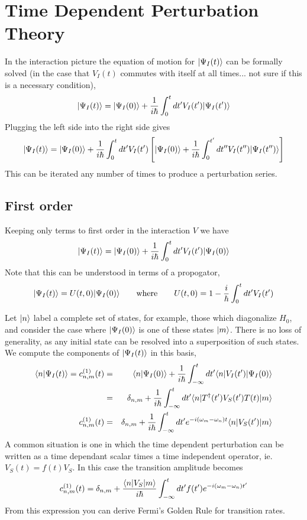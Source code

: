 \section{Time Dependent Perturbation Theory}

In the interaction picture the equation of motion for $| \Psi_{I}(t) \rangle$ can be formally solved (in the case that $V_I(t)$ commutes with itself at all times... not sure if this is a necessary condition), \begin{equation}
| \Psi_{I}(t) \rangle = | \Psi_{I}(0) \rangle+\frac{1}{i \hbar}\int_{0}^{t}dt'V_{I}(t')| \Psi_{I}(t') \rangle \end{equation}
Plugging the left side into the right side gives \begin{equation}
| \Psi_{I}(t) \rangle=| \Psi_{I}(0) \rangle+\frac{1}{i \hbar}\int_{0}^{t}dt'V_{I}(t')\left[| \Psi_{I}(0) \rangle+\frac{1}{i \hbar}\int_{0}^{t'}dt''V_{I}(t'')| \Psi_I(t'') \rangle\right]\end{equation}
This can be iterated any number of times to produce a perturbation series.

\subsection{First order}
Keeping only terms to first order in the interaction $V$ we have \begin{equation}
| \Psi_{I}(t) \rangle=| \Psi_{I}(0) \rangle+\frac{1}{i \hbar}\int_{0}^{t}dt'V_{I}(t')| \Psi_{I}(0) \rangle\end{equation}
Note that this can be understood in terms of a propogator, \begin{equation}
| \Psi_{I}(t) \rangle=U(t,0)| \Psi_{I}(0) \rangle\qquad\textrm{where}\qquad U(t,0)=1-\frac{i}{\hbar}\int_{0}^{t}dt'V_{I}(t')\end{equation}

Let $| n \rangle$ label a complete set of states, for example, those which diagonalize $H_0$, and consider the case where $| \Psi_I(0) \rangle$ is one of these states $| m \rangle$. There is no loss of generality, as any initial state can be resolved into a superposition of such states. We compute the components of $| \Psi_I(t) \rangle$ in this basis,
\begin{eqnarray}
\langle n|\Psi_I(t)\rangle = c^{(1)}_{n,m}(t) &=& \langle n|\Psi_I(0)\rangle + \frac{1}{i\hbar}\int_{-\infty}^t dt' \langle n |V_I(t')| \Psi_I(0) \rangle \\
&=& \delta_{n,m} + \frac{1}{i \hbar}\int_{-\infty}^t dt' \langle n |T^{\dagger}(t')V_S(t')T(t)| m \rangle \\
c^{(1)}_{n,m}(t) &=& \delta_{n,m} + \frac{1}{i \hbar}\int_{-\infty}^t dt' e^{-i (\omega_m-\omega_n) t} \langle n |V_S(t')| m \rangle
\end{eqnarray}
A common situation is one in which the time dependent perturbation can be written as a time dependant scalar times a time independent operator, ie. $V_S(t) = f(t)V_S$. In this case the transition amplitude becomes
\begin{equation}
c^{(1)}_{n,m}(t) = \delta_{n,m} + \frac{\langle n|V_S|m\rangle}{i \hbar}\int_{-\infty}^t dt' f(t') e^{-i(\omega_m - \omega_n)t'} \end{equation}
From this expression you can derive Fermi's Golden Rule for transition rates.

